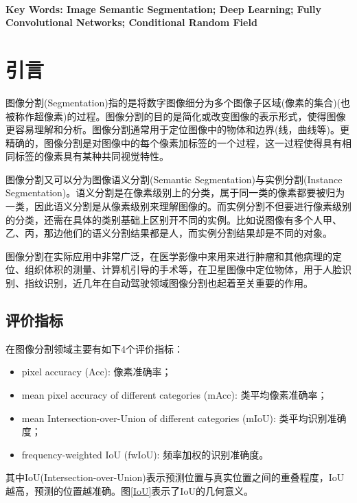 \documentclass[cn]{elegantbook}
\begin{document}
~\\

\noindent\textbf{Key Words: Image Semantic Segmentation; Deep Learning; Fully Convolutional Networks; Conditional Random Field}

\chapter{引言}
图像分割(Segmentation)指的是将数字图像细分为多个图像子区域(像素的集合)(也被称作超像素)的过程。图像分割的目的是简化或改变图像的表示形式，使得图像更容易理解和分析。图像分割通常用于定位图像中的物体和边界(线，曲线等)。更精确的，图像分割是对图像中的每个像素加标签的一个过程，这一过程使得具有相同标签的像素具有某种共同视觉特性。

图像分割又可以分为图像语义分割(Semantic Segmentation)与实例分割(Instance Segmentation)。语义分割是在像素级别上的分类，属于同一类的像素都要被归为一类，因此语义分割是从像素级别来理解图像的。而实例分割不但要进行像素级别的分类，还需在具体的类别基础上区别开不同的实例。比如说图像有多个人甲、乙、丙，那边他们的语义分割结果都是人，而实例分割结果却是不同的对象。

图像分割在实际应用中非常广泛，在医学影像中来用来进行肿瘤和其他病理的定位、组织体积的测量、计算机引导的手术等，在卫星图像中定位物体，用于人脸识别、指纹识别，近几年在自动驾驶领域图像分割也起着至关重要的作用。

\section{评价指标}
在图像分割领域主要有如下4个评价指标：
\begin{itemize}
	\item pixel accuracy (Acc): 像素准确率；
	\item mean pixel accuracy of different categories (mAcc): 类平均像素准确率；
	\item mean Intersection-over-Union of different categories (mIoU): 类平均识别准确度；
	\item frequency-weighted IoU (fwIoU): 频率加权的识别准确度。
\end{itemize}

其中IoU(Intersection-over-Union)表示预测位置与真实位置之间的重叠程度，IoU越高，预测的位置越准确。图\ref{IoU}表示了IoU的几何意义。
\end{document}
